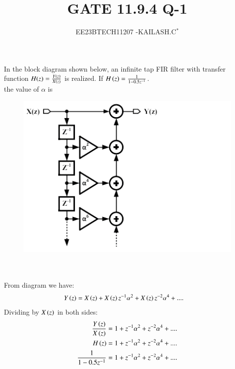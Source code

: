 \documentclass[journal,12pt,twocolumn]{IEEEtran}
\theoremstyle{remark}
\begin{document}

\vspace{3cm}

\title{GATE 11.9.4 Q-1}
\author{EE23BTECH11207 -KAILASH.C$^{*}$%
}
\maketitle
\newpage
\bigskip

\renewcommand{\thefigure}{\theenumi}
\renewcommand{\thetable}{\theenumi}
In the block diagram shown below, an infinite tap FIR filter with transfer function $H(z)=\frac{Y\left(z\right)}{X\left(z\right)}$ is realized. If $H\left(z\right)=\frac{1}{1-0.5z^{-1}}$.\\the value of $\alpha$ is
\begin{figure}[h]
    \includegraphics[width=1\columnwidth]{questionfig.png}
    \label{fig:question31bm}
\end{figure}\\
\solution
\\
From diagram we have:
\begin{align}
    Y\left(z\right)&=X\left(z\right)+X\left(z\right)z^{-1}\alpha^{2}+X\left(z\right)z^{-2}\alpha^{4}+....\label{eq:311.bm}
\end{align}
Dividing by $X\left(z\right)$ in both sides:
\begin{align}
    \frac{Y\left(z\right)}{X\left(z\right)}&=1+z^{-1}\alpha^{2}+z^{-2}\alpha^{4}+....\label{eq:312.bm}\\
    H\left(z\right)&=1+z^{-1}\alpha^{2}+z^{-2}\alpha^{4}+....\label{eq:313.bm}\\
    \frac{1}{1-0.5z^{-1}}&=1+z^{-1}\alpha^{2}+z^{-2}\alpha^{4}+....\label{eq:314.bm}
\end{align}
\end{document}
